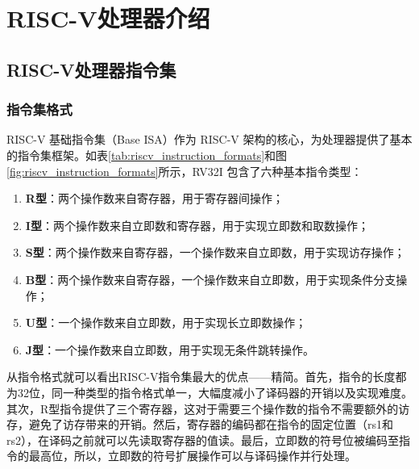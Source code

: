 
\chapter{RISC-V处理器介绍}

\section{RISC-V处理器指令集}

\subsection{指令集格式}

RISC-V 基础指令集（Base ISA）作为 RISC-V 架构的核心，为处理器提供了基本的指令集框架。如表\ref{tab:riscv_instruction_formats}和图\ref{fig:riscv_instruction_formats}所示，RV32I 包含了六种基本指令类型：
\begin{enumerate}[label={\arabic*)},itemsep=0pt, parsep=0pt]
	\item \textbf{R型}：两个操作数来自寄存器，用于寄存器间操作；
	\item \textbf{I型}：两个操作数来自立即数和寄存器，用于实现立即数和取数操作；
	\item \textbf{S型}：两个操作数来自寄存器，一个操作数来自立即数，用于实现访存操作；
	\item \textbf{B型}：两个操作数来自寄存器，一个操作数来自立即数，用于实现条件分支操作；
	\item \textbf{U型}：一个操作数来自立即数，用于实现长立即数操作；
	\item \textbf{J型}：一个操作数来自立即数，用于实现无条件跳转操作。
\end{enumerate}

从指令格式就可以看出RISC-V指令集最大的优点——精简。首先，指令的长度都为32位，同一种类型的指令格式单一，大幅度减小了译码器的开销以及实现难度。其次，R型指令提供了三个寄存器，这对于需要三个操作数的指令不需要额外的访存，避免了访存带来的开销。然后，寄存器的编码都在指令的固定位置（rs1和rs2），在译码之前就可以先读取寄存器的值读。最后，立即数的符号位被编码至指令的最高位，所以，立即数的符号扩展操作可以与译码操作并行处理。

